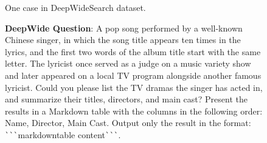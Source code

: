 \documentclass[11pt, letterpaper, logo, onecolumn, copyright, numbering]{paper_improved}
\begin{document}
\begin{figure}[htbp]
\caption{One case in DeepWideSearch dataset.}
\label{fig:one_case_in_deepwidesearch}
\end{figure}

\clearpage
\newpage

\begin{figure}[htbp]
    \begin{tcolorbox}[
        title=Case Deep2Wide\_26 Instance (Core Entity is Chen Yixun),
        colback=yellow!10,
        colbacktitle=black!80,
        coltitle=white,
        arc=1mm,
        boxrule=0pt,
        breakable]
        \textbf{DeepWide Question}: A pop song performed by a well-known Chinese singer, in which the song title appears ten times in the lyrics, and the first two words of the album title start with the same letter. The lyricist once served as a judge on a music variety show and later appeared on a local TV program alongside another famous lyricist. Could you please list the TV dramas the singer has acted in, and summarize their titles, directors, and main cast? Present the results in a Markdown table with the columns in the following order: Name, Director, Main Cast. Output only the result in the format: \verb|```|markdown{table content}\verb|```|.
    \end{tcolorbox}
    

\end{figure}
\end{document}
